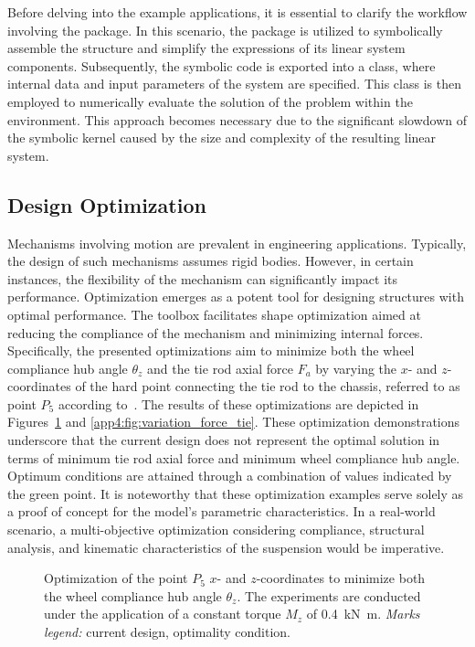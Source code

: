 Before delving into the example applications, it is essential to clarify the workflow involving the \TrussMe{} package. In this scenario, the \TrussMe{} package is utilized to symbolically assemble the structure and simplify the expressions of its linear system components. Subsequently, the symbolic code is exported into a \Matlab{} class, where internal data and input parameters of the system are specified. This \Matlab{} class is then employed to numerically evaluate the solution of the problem within the \Simulink{} environment. This approach becomes necessary due to the significant slowdown of the symbolic kernel caused by the size and complexity of the resulting linear system.

\subsection{Design Optimization}

Mechanisms involving motion are prevalent in engineering applications. Typically, the design of such mechanisms assumes rigid bodies. However, in certain instances, the flexibility of the mechanism can significantly impact its performance. Optimization emerges as a potent tool for designing structures with optimal performance. The \TrussMe{} toolbox facilitates shape optimization aimed at reducing the compliance of the mechanism and minimizing internal forces. Specifically, the presented optimizations aim to minimize both the wheel compliance hub angle $\theta_z$ and the tie rod axial force $F_a$ by varying the $x$- and $z$- coordinates of the hard point connecting the tie rod to the chassis, referred to as point $P_5$ according to~\cite{larcher2024imece_symbolic}. The results of these optimizations are depicted in Figures~\ref{app4:fig:variation_theta_z} and \ref{app4:fig:variation_force_tie}. These optimization demonstrations underscore that the current design does not represent the optimal solution in terms of minimum tie rod axial force and minimum wheel compliance hub angle. Optimum conditions are attained through a combination of values indicated by the green point. It is noteworthy that these optimization examples serve solely as a proof of concept for the model's parametric characteristics. In a real-world scenario, a multi-objective optimization considering compliance, structural analysis, and kinematic characteristics of the suspension would be imperative.

\begin{figure}[htb]
  \centering
  \small{}
  \caption{Optimization of the point $P_5$ $x$- and $z$-coordinates to minimize both the wheel compliance hub angle $\theta_z$. The experiments are conducted under the application of a constant torque $M_z$ of \SI{0.4}{\kilo\newton\meter}. \emph{Marks legend:} {\color{mycolor2}\raisebox{-.15pt}{\Large$\bullet$}} current design, {\color{mycolor5}\raisebox{-.15pt}{\Large$\bullet$}} optimality condition.}
  \label{app4:fig:variation_theta_z}
\end{figure}

